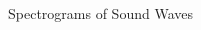 \documentclass[leqno,presentation]{beamer}
\theoremstyle{definition}
\begin{document}
\begin{frame}
\begin{columns}[t]



\begin{column}{.45\linewidth}













\begin{block}{Spectrograms of Sound Waves}


\end{block}
\end{column}
\end{columns}
\end{frame}
\end{document}

